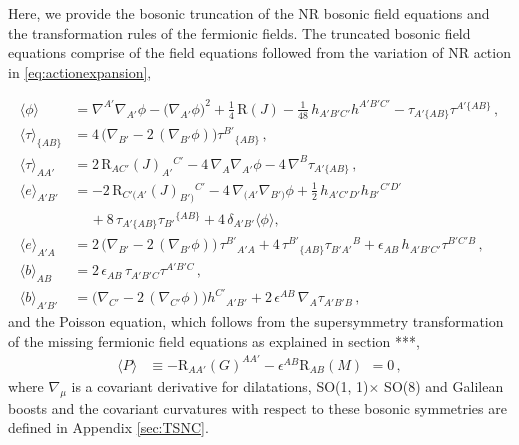 \documentclass[a4paper,10pt,openany]{article}
\def\rmR{\mathrm{R}}
\begin{document}
	Here, we provide the bosonic truncation of the NR bosonic field equations and the transformation rules of the fermionic fields.
	The truncated bosonic field equations comprise of the field equations followed from the variation of NR action in \eqref{eq:actionexpansion},
	
	
	\begin{subequations}\label{eq:nrBEOM}
		\begin{align}
			\langle \phi\rangle   &
			=\nabla^{A'}\nabla_{A'}\phi - \big(\nabla_{A'}\phi \big)^2 + \frac14\,\rmR(J) - \frac{1}{48}\,h_{A'B'C'}h^{A'B'C'} - \tau_{A'\{AB\}}\tau^{A'\{AB\}}\,,\label{eq:phi}\\
			\langle \tau\rangle _{\{AB\}} &
			= 4\,\big(\nabla_{B'} - 2\,(\nabla_{B'}\phi)\big)\tau^{B'}{}_{\{AB\}}\,,\label{eq:STL}\\
			\langle \tau \rangle _{AA'} &
			=2 \, \rmR_{AC'}(J)_{A'}{}^{C'} -4 \,\nabla_A\nabla_{A'}\phi -4\,\nabla^B\tau_{A'\{AB\}}\,,\label{eq:V-}\\
			\langle e\rangle _{A'B'} &
			= -2\, \rmR_{C'(A'}(J)_{B')}{}^{C'} -4\,\nabla_{(A'}\nabla_{B')}\phi + \frac12\,h_{A'C'D'}h_{B'}{}^{C'D'}\nonumber \\&\quad\, + 8\,\tau_{A'\{AB\}}\tau_{B'}{}^{\{AB\}}+4\,\delta_{A'B'}\langle\phi \rangle ,\label{eq:GA'B'}\\
			\langle e\rangle _{A'A} &
			= 2\,\big(\nabla_{B'} -2\,( \nabla_{B'}\phi)\big)\,\tau^{B'}{}_{A'A} + 4\,\tau^{B'}{}_{\{AB\}}\tau_{B'A'}{}^B + \epsilon_{AB}\,h_{A'B'C'}\tau^{B'C'B}\,,\label{eq:V+}\\
			\langle b\rangle_{AB}  &
			= 2\,\epsilon_{AB}\,\tau_{A'B'C}\tau^{A'B'C}\,,\label{eq:S-}\\
			\langle b\rangle _{A'B'} &
			= \big(\nabla_{C'} - 2\,(\nabla_{C'}\phi)\big) h^{C'}{}_{A'B'} + 2\,\epsilon^{AB}\,\nabla_A\tau_{A'B'B}\,,\label{eq:BA'B'}
	\end{align}   \end{subequations}
	and the Poisson equation, which follows from the supersymmetry transformation of the missing fermionic field equations as explained in section ***, \begin{align} \label{eq:Poisson}
		\langle P\rangle &
		\equiv -\rmR_{AA'}(G)^{AA'} - \epsilon^{AB} \rmR_{AB}(M) \ \, = 0\,,
	\end{align}
	where  $\nabla_\mu$ is a covariant derivative for dilatations, SO(1, 1)$\times$ SO(8) and Galilean
	boosts and the covariant curvatures with respect to these bosonic symmetries are defined in Appendix \ref{sec:TSNC}.
	
\end{document}
